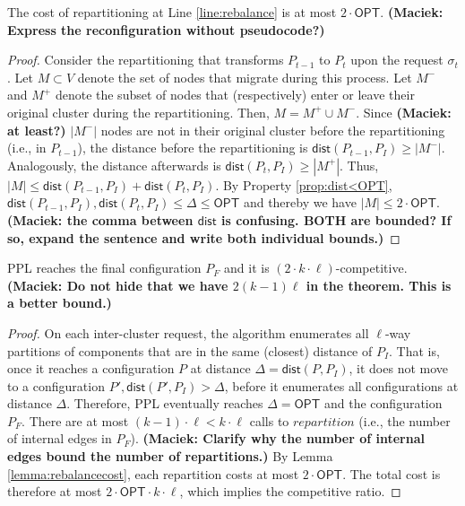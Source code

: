 \documentclass[a4paper,anonymous,USenglish]{lipics-v2019}
\newcommand{\OPT}{\textsf{OPT}\xspace}
\newcommand{\PPL}{\textsf{PPL}\xspace}
\newcommand{\dist}{\textsf{dist}}
\newcommand\mahmoud[1]{\color{orange}\textbf{Mahmoud: #1~}\color{black}}
\newcommand\maciek[1]{\color{brown}\textbf{(Maciek: #1)}\color{black}}
\begin{document}
\begin{lemma}	\label{lemma:rebalancecost}
	The cost of repartitioning at Line \ref{line:rebalance} is at most $2\cdot\OPT$.
	\maciek{Express the reconfiguration without pseudocode?}
\end{lemma}
\begin{proof}
	Consider the repartitioning that transforms $P_{t-1}$ to $P_t$ upon the request $\sigma_t$.
	Let $M \subset V$ denote the set of nodes that migrate during this process.
	Let $M^-$ and $M^+$ denote the subset of nodes that (respectively)
	enter or leave their original cluster during the repartitioning.    
	Then,
	$M = M^+ \cup M^-$.
	Since \maciek{at least?} $|M^-|$ nodes are not in their original cluster before the repartitioning (i.e., in $P_{t-1}$),
	the distance before the repartitioning is $\dist(P_{t-1},P_I) \geq | M^-|$.
	Analogously,
	the distance afterwards is $\dist(P_{t},P_I) \geq | M^+|$.
	Thus,
	$|M| \leq \dist(P_{t-1},P_I) + \dist(P_{t},P_I)$.
	By Property \ref{prop:dist<OPT},
	$\dist(P_{t-1},P_I) , \dist(P_{t},P_I) \leq \Delta \leq \OPT$
	and thereby we have	
	$|M| \leq 2\cdot\OPT$.
	\maciek{the comma between $\dist$ is confusing. BOTH are bounded? If so, expand the sentence and write both individual bounds.}
\end{proof}

\begin{theorem}	\label{thm:upperbound}
	\PPL reaches the final configuration $P_F$ and it is $(2\cdot k\cdot\ell)$-competitive.
	\maciek{Do not hide that we have $2(k-1)\ell$ in the theorem. This is a better bound.}
\end{theorem}
\begin{proof}
	On each inter-cluster request,
	the algorithm enumerates all $\ell$-way partitions of components
	that are in the same (closest) distance of $P_I$.
	That is, 
	once it reaches a configuration $P$ at distance $\Delta = \dist(P, P_I)$,
	it does not move to a configuration
	$P', \dist(P', P_I) > \Delta$,
	before it enumerates all configurations at distance $\Delta$.
	Therefore,
	\PPL eventually reaches $\Delta=\OPT$ and the configuration $P_F$.
	There are at most $(k-1)\cdot\ell < k\cdot\ell $ calls   to $\mathit{repartition}$
	(i.e., the number of internal edges in $P_F$).
	\maciek{Clarify why the number of internal edges bound the number of repartitions.}
	By Lemma \ref{lemma:rebalancecost},
	each repartition costs at most $2\cdot\OPT$.
	The total cost is therefore at most $2\cdot\OPT\cdot k\cdot\ell$, which implies the competitive ratio.
\end{proof}
\end{document}
